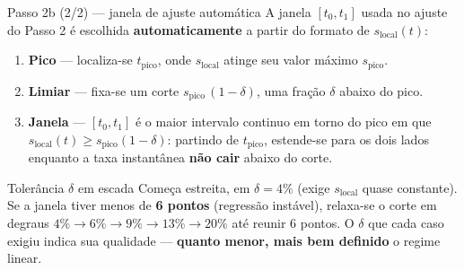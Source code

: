 \documentclass[aspectratio=169,11pt]{beamer}
\newcommand{\sloc}{s_{\mathrm{local}}}
\begin{document}
\begin{frame}{Passo 2b (2/2) — janela de ajuste automática}
  A janela $[t_0,t_1]$ usada no ajuste do Passo 2 é escolhida
  \textbf{automaticamente} a partir do formato de $\sloc(t)$:
  \begin{enumerate}
    \item \textbf{Pico} — localiza-se $t_{\mathrm{pico}}$, onde $\sloc$ atinge
          seu valor máximo $s_{\mathrm{pico}}$.
    \item \textbf{Limiar} — fixa-se um corte $s_{\mathrm{pico}}\,(1-\delta)$,
          uma fração $\delta$ abaixo do pico.
    \item \textbf{Janela} — $[t_0,t_1]$ é o maior intervalo continuo em
          torno do pico em que $\sloc(t)\ge s_{\mathrm{pico}}(1-\delta)$:
          partindo de $t_{\mathrm{pico}}$, estende-se para os dois lados
          enquanto a taxa instantânea \textbf{não cair} abaixo do corte.
  \end{enumerate}
  \begin{block}{Tolerância $\delta$ em escada}
    \footnotesize
    Começa estreita, em $\delta=4\%$ (exige $\sloc$ quase constante). Se a
    janela tiver menos de \textbf{6 pontos} (regressão instável), relaxa-se o
    corte em degraus $4\%\to6\%\to9\%\to13\%\to20\%$ até reunir 6 pontos. O
    $\delta$ que cada caso exigiu indica sua qualidade —
    \textbf{quanto menor, mais bem definido} o regime linear.
  \end{block}
\end{frame}
\end{document}
